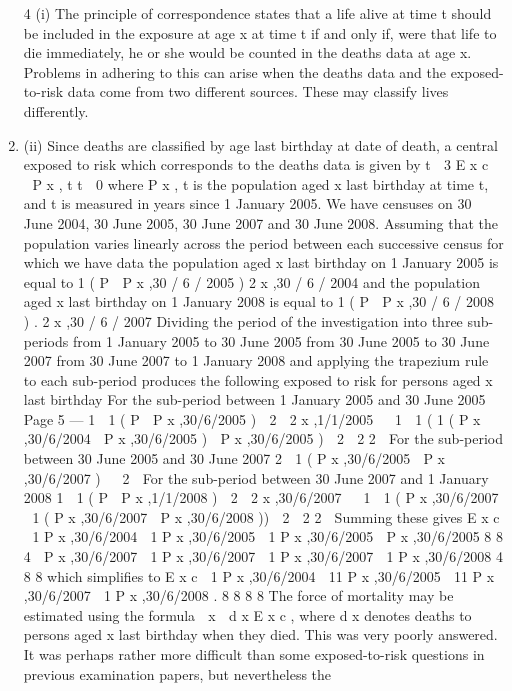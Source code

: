 \documentclass[a4paper,12pt]{article}
\begin{document}
\begin{enumerate}
4
(i) The principle of correspondence states that a life alive at time t should be
included in the exposure at age x at time t if and only if, were that life to die
immediately, he or she would be counted in the deaths data at age x. Problems
in adhering to this can arise when the deaths data and the exposed-to-risk data
come from two different sources. These may classify lives differently.
\item (ii) Since deaths are classified by age last birthday at date of death, a central
exposed to risk which corresponds to the deaths data is given by
t  3
E x c

 P x , t
t  0
where P x , t is the population aged x last birthday at time t, and t is measured in
years since 1 January 2005. We have censuses on 30 June 2004, 30 June 2005,
30 June 2007 and 30 June 2008.
Assuming that the population varies linearly across the period between each
successive census for which we have data the population aged x last birthday
on 1 January 2005 is equal to
1 ( P
 P x ,30 / 6 / 2005 )
2 x ,30 / 6 / 2004
and the population aged x last birthday on 1 January 2008 is equal to
1 ( P
 P x ,30 / 6 / 2008 ) .
2 x ,30 / 6 / 2007
Dividing the period of the investigation into three sub-periods
from 1 January 2005 to 30 June 2005
from 30 June 2005 to 30 June 2007
from 30 June 2007 to 1 January 2008
and applying the trapezium rule to each sub-period produces the following
exposed to risk for persons aged x last birthday
For the sub-period between 1 January 2005 and 30 June 2005
Page 5  — %
1  1 ( P
 P x ,30/6/2005 ) 
2  2 x ,1/1/2005

 1  1 ( 1 ( P x ,30/6/2004  P x ,30/6/2005 )  P x ,30/6/2005 ) 
2  2 2

For the sub-period between 30 June 2005 and 30 June 2007
2  1 ( P x ,30/6/2005  P x ,30/6/2007 ) 
 2

For the sub-period between 30 June 2007 and 1 January 2008
1  1 ( P
 P x ,1/1/2008 ) 
2  2 x ,30/6/2007

 1  1 ( P x ,30/6/2007  1 ( P x ,30/6/2007  P x ,30/6/2008 )) 
2  2
2

Summing these gives
E x c  1 P x ,30/6/2004  1 P x ,30/6/2005  1 P x ,30/6/2005  P x ,30/6/2005
8
8
4
 P x ,30/6/2007  1 P x ,30/6/2007  1 P x ,30/6/2007  1 P x ,30/6/2008
4
8
8
which simplifies to
E x c  1 P x ,30/6/2004  11 P x ,30/6/2005  11 P x ,30/6/2007  1 P x ,30/6/2008 .
8
8
8
8
The force of mortality may be estimated using the formula
 x 
d x
E x c
,
where d x denotes deaths to persons aged x last birthday when they died.
This was very poorly answered. It was perhaps rather more difficult than some
exposed-to-risk questions in previous examination papers, but nevertheless the

\end{enumerate}
\end{document}
